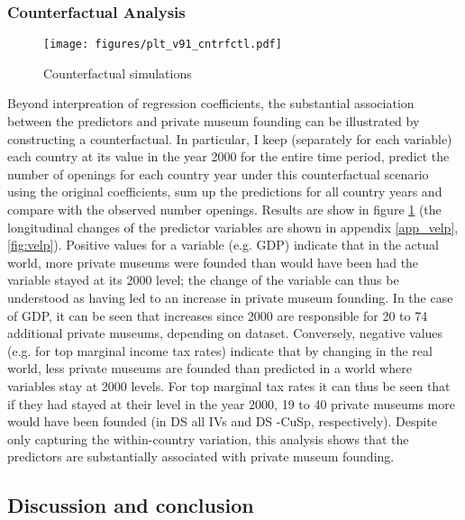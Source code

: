 \documentclass[11pt]{article}
\begin{document}
\subsubsection*{Counterfactual Analysis}

\begin{figure}[htbp]
\centering
\texttt{[image: figures/plt\_v91\_cntrfctl.pdf]}
\caption{\label{fig:cntrfctl}Counterfactual simulations}
\end{figure}

Beyond interpreation of regression coefficients, the substantial association between the predictors and private museum founding can be illustrated by constructing a counterfactual.
In particular, I keep (separately for each variable) each country at its value in the year 2000 for the entire time period, predict the number of openings for each country year under this counterfactual scenario using the original coefficients, sum up the predictions for all country years and compare with the observed number openings.
Results are show in figure \ref{fig:cntrfctl} (the longitudinal changes of the predictor variables are shown in appendix \ref{app_velp}, \ref{fig:velp}).
Positive values for a variable (e.g. GDP) indicate that in the actual world, more private museums were founded than would have been had the variable stayed at its 2000 level; the change of the variable can thus be understood as having led to an increase in private museum founding.
In the case of GDP, it can be seen that increases since 2000 are responsible for 20 to 74 additional private museums, depending on dataset. 
Conversely, negative values (e.g. for top marginal income tax rates) indicate that by changing in the real world, less private museums are founded than predicted in a world where variables stay at 2000 levels.
For top marginal tax rates it can thus be seen that if they had stayed at their level in the year 2000, 19 to 40 private museums more would have been founded (in DS all IVs and DS -CuSp, respectively).
Despite only capturing the within-country variation, this analysis shows that the predictors are substantially associated with private museum founding.


\subsection*{Discussion and conclusion}
\end{document}
